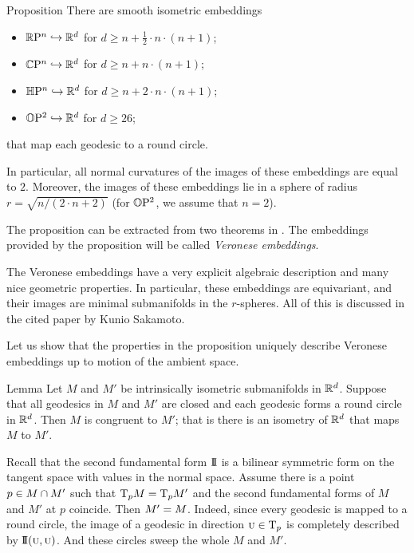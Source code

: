 \documentclass[a4paper,10pt]{article}
\begin{document}
\begin{thm}{Proposition}
There are smooth isometric embeddings
\begin{itemize}
 \item $\mathbb{R}\mathrm{P}^n \hookrightarrow\mathbb{R}^d$ for $d\ge n+\tfrac12\cdot n\cdot(n+1)$;
 \item $\mathbb{C}\mathrm{P}^n \hookrightarrow\mathbb{R}^d$ for $d\ge n+n\cdot(n+1)$;
 \item $\mathbb{H}\mathrm{P}^n \hookrightarrow\mathbb{R}^d$ for $d\ge n+2\cdot n\cdot(n+1)$;
 \item $\mathbb{O}\mathrm{P}^2 \hookrightarrow\mathbb{R}^d$ for $d\ge 26$;
\end{itemize}
that map each geodesic to a round circle.

In particular, all normal curvatures of the images of these embeddings are equal to $2$.
Moreover, the images of these embeddings lie in a sphere of radius $r=\sqrt{n/(2\cdot n+2)}$ (for $\mathbb{O}\mathrm{P}^2$, we assume that $n=2$). 
\end{thm}

The proposition can be extracted from two theorems in \cite[§ 2]{sakamoto}.
The embeddings provided by the proposition will be called \emph{Veronese embeddings}.

The Veronese embeddings have a very explicit algebraic description and many nice geometric properties.
In particular,
these embeddings are equivariant, and 
their images are minimal submanifolds in the $r$-spheres.
All of this is discussed in the cited paper by Kunio Sakamoto.

Let us show that the properties in the proposition uniquely describe
Veronese embeddings up to motion of the ambient space.

\begin{thm}{Lemma}
Let $M$ and $M'$ be intrinsically isometric submanifolds in $\mathbb{R}^d$.
Suppose that all geodesics in $M$ and $M'$ are closed
and each geodesic forms a round circle in $\mathbb{R}^d$.
Then $M$ is congruent to $M'$;
that is there is an isometry of $\mathbb{R}^d$ that maps $M$ to $M'$.
\end{thm}

Recall that the second fundamental form $\mathrm{I}\!\mathrm{I}$ is a bilinear symmetric form on the tangent space with values in the normal space.
Assume there is a point $p\z\in M\cap M'$ such that $\mathrm{T}_pM=\mathrm{T}_pM'$ and the second fundamental forms of $M$ and $M'$ at $p$ coincide.
Then $M'\z=M$.
Indeed, since every geodesic is mapped to a round circle, the image of a geodesic in direction ${{\normalfont\textsc{u}}}\in \mathrm{T}_p$ is completely described by $\mathrm{I}\!\mathrm{I}({{\normalfont\textsc{u}}},{{\normalfont\textsc{u}}})$.
And these circles sweep the whole $M$ and $M'$.
\end{document}
